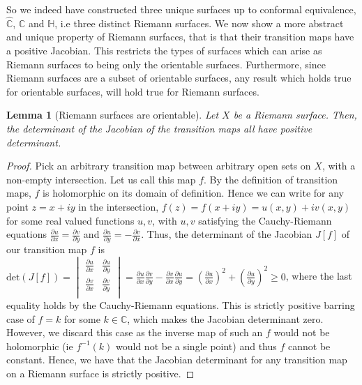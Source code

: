 \documentclass[11pt]{report}
\newtheorem{lemma}[thm]{Lemma}
\theoremstyle{definition}
\begin{document}
So we indeed have constructed three unique surfaces up to conformal equivalence, $\widehat{\mathbb{C}}$, $\mathbb{C}$ and $\mathbb{H}$, i.e three distinct Riemann surfaces. We now show a more abstract and unique property of Riemann surfaces, that is that their transition maps have a positive Jacobian. This restricts the types of surfaces which can arise as Riemann surfaces to being only the orientable surfaces. Furthermore, since Riemann surfaces are a subset of orientable surfaces, any result which holds true for orientable surfaces, will hold true for Riemann surfaces. 
\begin{lemma}[Riemann surfaces are orientable]
  Let $X$ be a Riemann surface. Then, the determinant of the Jacobian of the transition maps all have positive determinant.
\end{lemma}
\begin{proof}
  Pick an arbitrary transition map between arbitrary open sets on $X$, with a non-empty intersection. Let us call this map $f$. By the definition of transition maps, $f$ is holomorphic on its domain of definition. Hence we can write for any point $z=x+iy$ in the intersection, $f(z) = f(x+iy)=u(x,y)+iv(x,y)$ for some real valued functions $u,v$, with $u,v$ satisfying the Cauchy-Riemann equations $\frac{\partial u}{\partial x} = \frac{\partial v}{\partial y}$ and $\frac{\partial u}{\partial y} = -\frac{\partial v}{\partial x}$. 
  Thus, the determinant of the Jacobian $J[f]$ of our transition map $f$ is 
  $\text{det}(J[f])=\begin{vmatrix}
    \frac{\partial u}{\partial x} & \frac{\partial u}{\partial y} \\
    \frac{\partial v}{\partial x} & \frac{\partial v}{\partial y} \\
  \end{vmatrix} = \frac{\partial u}{\partial x}\frac{\partial v}{\partial y} -  \frac{\partial v}{\partial x}\frac{\partial u}{\partial y}= (\frac{\partial u}{\partial x})^2 + (\frac{\partial u}{\partial y})^2 \geq 0$, where the last equality holds by the Cauchy-Riemann equations. This is strictly positive barring case of $f=k$ for some $k\in \mathbb{C}$, which makes the Jacobian determinant zero. However, we discard this case as the inverse map of such an $f$ would not be holomorphic (ie $f^{-1}(k)$ would not be a single point) and thus $f$ cannot be constant. Hence, we have that the Jacobian determinant for any transition map on a Riemann surface is strictly positive.
\end{proof}
\end{document}
